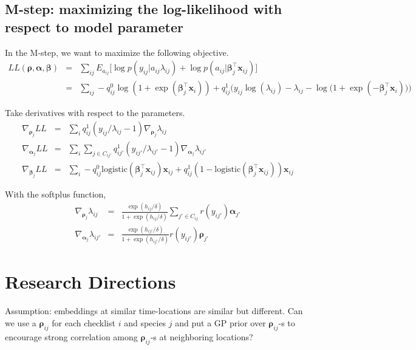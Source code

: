 \documentclass{article}
\newcommand{\wt}{\boldsymbol{\rho}}
\newcommand{\obswt}{\boldsymbol{\beta}}
\newcommand{\emb}{\boldsymbol{\alpha}}
\begin{document}
\subsection{M-step: maximizing the log-likelihood with respect to model parameter}

In the M-step, we want to maximize the following objective. 
\begin{eqnarray}
LL(\wt, \emb, \obswt) &=& \sum_{ij} E_{a_{ij}} \Big[\log p\left(y_{ij} | a_{ij} \lambda_{ij} \right) + \log p\left(a_{ij} | \obswt_j^\top \mathbf{x}_{ij}\right)\Big] \nonumber\\
&=& \sum_{ij}  - q_{ij}^0 \log (1 +  \exp(\obswt_j^\top \mathbf{x}_i)) + q_{ij}^1 \Big( y_{ij}\log(\lambda_{ij}) - \lambda_{ij} - \log \big(1 + \exp( - \obswt_j^\top \mathbf{x}_i) \big) \Big) \nonumber
\end{eqnarray}

Take derivatives with respect to the parameters. 
\begin{eqnarray}
\nabla_{\wt_j} LL &=& \sum_{i}  q_{ij}^1 \left( y_{ij}/\lambda_{ij} - 1 \right)
\nabla_{\wt_j} \lambda_{ij} \\
\nabla_{\emb_j} LL &=& \sum_{i}\sum_{j \in C_{ij'}}  q_{ij'}^1 \left( y_{ij'}/\lambda_{ij'} - 1 \right)
\nabla_{\emb_j} \lambda_{ij'} \\
\nabla_{\obswt_j} LL  &=& \sum_{i} - q_{ij}^0 \mathrm{logistic}(\obswt_j^\top \mathbf{x}_{ij}) \mathbf{x}_{ij} + q_{ij}^1 (1 - \mathrm{logistic}(\obswt_j^\top \mathbf{x}_{ij})) \mathbf{x}_{ij}
\end{eqnarray}

With the softplus function, 
\begin{eqnarray}
\nabla_{\wt_j} \lambda_{ij} &=& \frac{\exp(h_{ij} / \delta)}{1 + \exp(h_{ij} / \delta)} \sum_{j' \in C_{ij}} r(y_{ij'}) \emb_{j'} \\
\nabla_{\emb_{j}} \lambda_{ij'} &=& \frac{\exp(h_{ij'} / \delta)}{1 + \exp(h_{ij'} / \delta)}  r(y_{ij'}) \wt_{j'}
\end{eqnarray}

\section{Research Directions}

Assumption: embeddings at similar time-locations are similar but different. Can we use a $\wt_{ij}$ for each checklist $i$ and species $j$ and put a GP prior over $\wt_{ij}$-s to encourage strong correlation among $\wt_{ij}$-s at neighboring locations?  
\end{document}
